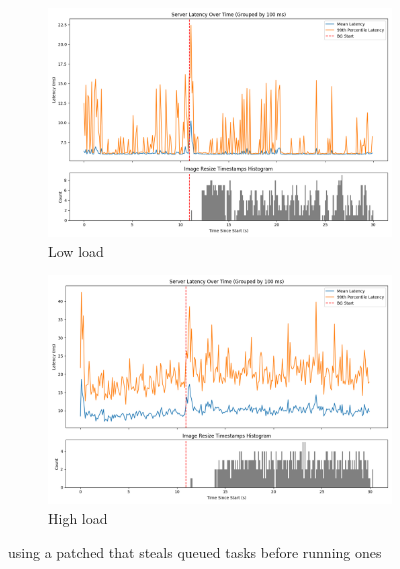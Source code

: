 \begin{figure}[t]
    \centering
    \begin{subfigure}[t]{0.49\columnwidth}
        \includegraphics[width=\columnwidth]{graphs/patched-idle-low-two.png}
        \caption{Low load}\label{fig:patched-idle-low-two}
    \end{subfigure}
    \hspace{\fill}
    \begin{subfigure}[t]{0.49\columnwidth}
        \includegraphics[width=\columnwidth]{graphs/patched-idle-high-two.png}
        \caption{High load}\label{fig:patched-idle-high-two}
    \end{subfigure}
    \vspace{4pt}
    \caption{using a patched \schedidle{} that steals queued \schednormal{}
    tasks before running \schedidle{} ones}\label{fig:patched-idle}
\end{figure}

